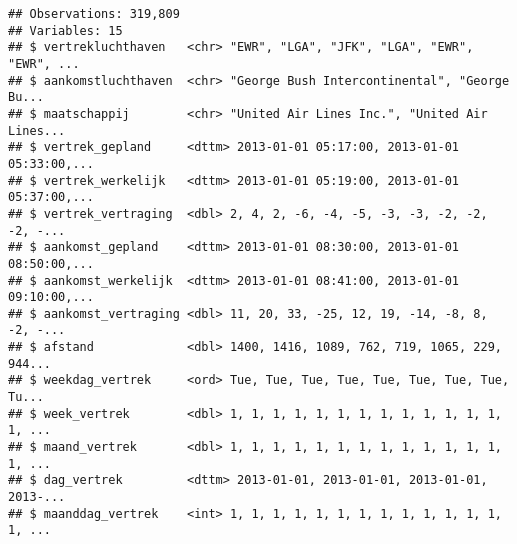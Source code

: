\documentclass[]{memoir}
\newenvironment{Shaded}{\begin{snugshade}}{\end{snugshade}}
\newcommand{\DataTypeTok}[1]{\textcolor[rgb]{0.13,0.29,0.53}{#1}}
\newcommand{\KeywordTok}[1]{\textcolor[rgb]{0.13,0.29,0.53}{\textbf{#1}}}
\newcommand{\NormalTok}[1]{#1}
\newcommand{\OperatorTok}[1]{\textcolor[rgb]{0.81,0.36,0.00}{\textbf{#1}}}
\newcommand{\StringTok}[1]{\textcolor[rgb]{0.31,0.60,0.02}{#1}}
\begin{document}
\begin{Shaded}
\end{Shaded}

\begin{verbatim}
## Observations: 319,809
## Variables: 15
## $ vertrekluchthaven   <chr> "EWR", "LGA", "JFK", "LGA", "EWR", "EWR", ...
## $ aankomstluchthaven  <chr> "George Bush Intercontinental", "George Bu...
## $ maatschappij        <chr> "United Air Lines Inc.", "United Air Lines...
## $ vertrek_gepland     <dttm> 2013-01-01 05:17:00, 2013-01-01 05:33:00,...
## $ vertrek_werkelijk   <dttm> 2013-01-01 05:19:00, 2013-01-01 05:37:00,...
## $ vertrek_vertraging  <dbl> 2, 4, 2, -6, -4, -5, -3, -3, -2, -2, -2, -...
## $ aankomst_gepland    <dttm> 2013-01-01 08:30:00, 2013-01-01 08:50:00,...
## $ aankomst_werkelijk  <dttm> 2013-01-01 08:41:00, 2013-01-01 09:10:00,...
## $ aankomst_vertraging <dbl> 11, 20, 33, -25, 12, 19, -14, -8, 8, -2, -...
## $ afstand             <dbl> 1400, 1416, 1089, 762, 719, 1065, 229, 944...
## $ weekdag_vertrek     <ord> Tue, Tue, Tue, Tue, Tue, Tue, Tue, Tue, Tu...
## $ week_vertrek        <dbl> 1, 1, 1, 1, 1, 1, 1, 1, 1, 1, 1, 1, 1, 1, ...
## $ maand_vertrek       <dbl> 1, 1, 1, 1, 1, 1, 1, 1, 1, 1, 1, 1, 1, 1, ...
## $ dag_vertrek         <dttm> 2013-01-01, 2013-01-01, 2013-01-01, 2013-...
## $ maanddag_vertrek    <int> 1, 1, 1, 1, 1, 1, 1, 1, 1, 1, 1, 1, 1, 1, ...
\end{verbatim}
\end{document}
